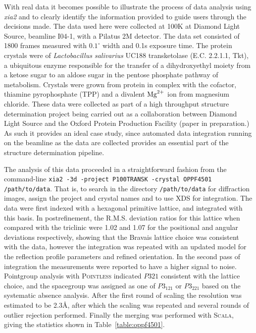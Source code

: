 \documentclass[preprint,pdf]{iucr}
\begin{document}
With real data it becomes possible to illustrate the process of data
analysis using \emph{xia2} and to clearly identify the information
provided to guide users through the decisions made. The data
used here were collected at 100K at Diamond Light Source, beamline
I04-1, with a Pilatus 2M detector. The data set consisted of 1800
frames measured with $0.1^{\circ}$ width and 0.1s exposure time.
The protein crystals were of
\emph{Lactobacillus salivarius} UC188 transketolase (E.C. 2.2.1.1, Tkt), a
ubiquitous enzyme responsible for the transfer of a dihydroxyethyl
moiety from a ketose sugar to an aldose sugar in the pentose phosphate
pathway of metabolism. Crystals were grown from protein in complex
with the cofactor, thiamine pyrophosphate (TPP) and a divalent $\rm{Mg}^{2+}$
ion from magnesium chloride. These data were collected as part of
a high throughput structure determination project being carried out as
a collaboration between Diamond Light Source and the Oxford Protein
Production Facility (paper in preparation.) As such it provides an
ideal case study, since automated data integration running on the
beamline as the data are collected provides an essential part of the
structure determination pipeline. 

The analysis of this data proceeded in a straightforward fashion from
the command-line 
\verb|xia2 -3d -project P100TRANSK -crystal OPPF4501 /path/to/data|.
That is, to search in the directory \verb|/path/to/data| for
diffraction images, assign the project and crystal names and to use
XDS for integration. 
The data were first indexed with a hexagonal primitive lattice, and
integrated with this basis. In postrefinement, the R.M.S. deviation
ratios for this lattice when compared with the triclinic were 1.02 and
1.07 for the positional and angular deviations respectively, showing
that the Bravais lattice choice was consistent with the data, however
the integration was repeated with an updated model for the reflection
profile parameters
and refined orientation. In the second pass of integration the
measurements were reported to have a higher signal to noise. Pointgroup
analysis with \textsc{Pointless} indicated $P321$ consistent with the lattice
choice, and the spacegroup was assigned as one of $P3_121$ or $P3_221$
based on the systematic absence analysis. After the first round of
scaling the resolution was estimated to be 2.3\AA, after which
the scaling was repeated and several rounds of outlier rejection
performed. Finally the merging was performed with \textsc{Scala}, giving the
statistics shown in Table~\ref{table:oppf4501}. 
\end{document}
